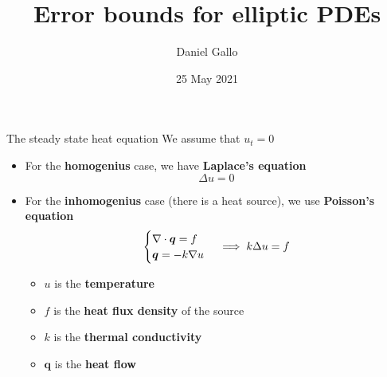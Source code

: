 \documentclass{beamer}
\title{Error bounds for elliptic PDEs}
\author{Daniel Gallo}
\institute{University of Bergen}
\date{25 May 2021}
\def\R{\mathbb{R}}
\begin{document}
    \begin{frame}
        \titlepage
    \end{frame}


    \begin{frame}{The steady state heat equation}
        We assume that $u_t = 0$
        \begin{itemize}
            \item For the \textbf{homogenius} case, we have \textbf{Laplace's equation}
            \begin{equation*}
                \Delta u = 0
            \end{equation*}
            \item For the \textbf{inhomogenius} case (there is a heat source), we use \textbf{Poisson's equation}
            \begin{equation*}
                \begin{cases}
                    \nabla \cdot \bm{q} = f \\
                    \bm{q} = -k \nabla u
                \end{cases}
                \implies
                \-k \Delta u = f
            \end{equation*}
            \begin{itemize}
                \item $u$ is the \textbf{temperature}
                \item $f$ is the \textbf{heat flux density} of the source
                \item $k$ is the \textbf{thermal conductivity}
                \item $\bm{q}$ is the \textbf{heat flow}
            \end{itemize}
        \end{itemize}
    \end{frame}
\end{document}

